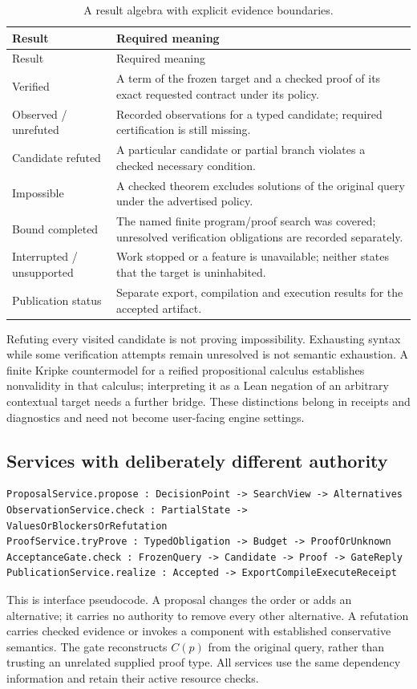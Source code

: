\begin{longtable}{@{}L{32mm}L{119mm}@{}}
\caption{A result algebra with explicit evidence boundaries.}\label{tab:result-evidence}\\
\toprule Result & Required meaning\\\midrule\endfirsthead
\toprule Result & Required meaning\\\midrule\endhead
Verified & A term of the frozen target and a checked proof of its exact requested contract under its policy.\\
Observed / unrefuted & Recorded observations for a typed candidate; required certification is still missing.\\
Candidate refuted & A particular candidate or partial branch violates a checked necessary condition.\\
Impossible & A checked theorem excludes solutions of the original query under the advertised policy.\\
Bound completed & The named finite program/proof search was covered; unresolved verification obligations are recorded separately.\\
Interrupted / unsupported & Work stopped or a feature is unavailable; neither states that the target is uninhabited.\\
Publication status & Separate export, compilation and execution results for the accepted artifact.\\
\bottomrule
\end{longtable}

Refuting every visited candidate is not proving impossibility. Exhausting
syntax while some verification attempts remain unresolved is not semantic
exhaustion. A finite Kripke countermodel for a reified propositional calculus
establishes nonvalidity in that calculus; interpreting it as a Lean negation
of an arbitrary contextual target needs a further bridge. These distinctions
belong in receipts and diagnostics and need not become user-facing engine
settings.

\subsection{Services with deliberately different authority}

\begin{lstlisting}
ProposalService.propose : DecisionPoint -> SearchView -> Alternatives
ObservationService.check : PartialState -> ValuesOrBlockersOrRefutation
ProofService.tryProve : TypedObligation -> Budget -> ProofOrUnknown
AcceptanceGate.check : FrozenQuery -> Candidate -> Proof -> GateReply
PublicationService.realize : Accepted -> ExportCompileExecuteReceipt
\end{lstlisting}
This is interface pseudocode. A proposal changes the order or adds an
alternative; it carries no authority to remove every other alternative.
A refutation carries checked evidence or invokes a component with established
conservative semantics. The gate reconstructs $C(p)$ from the original query,
rather than trusting an unrelated supplied proof type. All services use the
same dependency information and retain their active resource checks.

